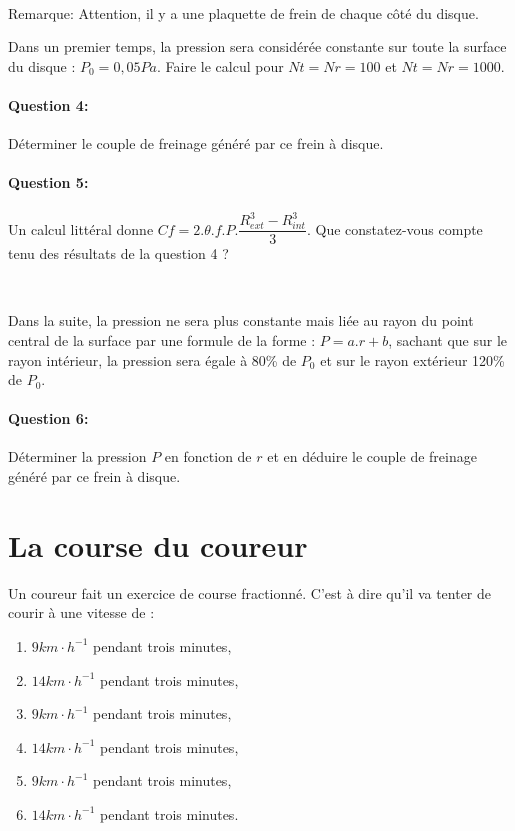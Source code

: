 ~\

Remarque: Attention, il y a une plaquette de frein de chaque côté du disque.

Dans un premier temps, la pression sera considérée constante sur toute la surface du disque : $P_0=0,05Pa$. Faire le calcul pour $Nt=Nr=100$ et $Nt=Nr=1000$.

\paragraph{Question 4:} Déterminer le couple de freinage généré par ce frein à disque.

\paragraph{Question 5:} Un calcul littéral donne $Cf=2.\theta.f.P.\dfrac{R_{ext}^3-R_{int}^3}{3}$. Que constatez-vous compte tenu des résultats de la question 4 ?

~\

Dans la suite, la pression ne sera plus constante mais liée au rayon du point central de la surface par une formule de la forme : $P=a.r+b$, sachant que sur le rayon intérieur, la pression sera égale à 80\% de $P_0$ et sur le rayon extérieur 120\% de $P_0$.

\paragraph{Question 6:} Déterminer la pression $P$ en fonction de $r$ et en déduire le couple de freinage généré par ce frein à disque.

\section{La course du coureur}

Un coureur fait un exercice de course fractionné. C'est à dire qu'il va tenter de courir à une vitesse de :
\begin{enumerate}
 \item $9km\cdot h^{-1}$ pendant trois minutes,
 \item $14km\cdot h^{-1}$ pendant trois minutes,
 \item $9km\cdot h^{-1}$ pendant trois minutes,
 \item $14km\cdot h^{-1}$ pendant trois minutes,
 \item $9km\cdot h^{-1}$ pendant trois minutes,
 \item $14km\cdot h^{-1}$ pendant trois minutes.
\end{enumerate}

